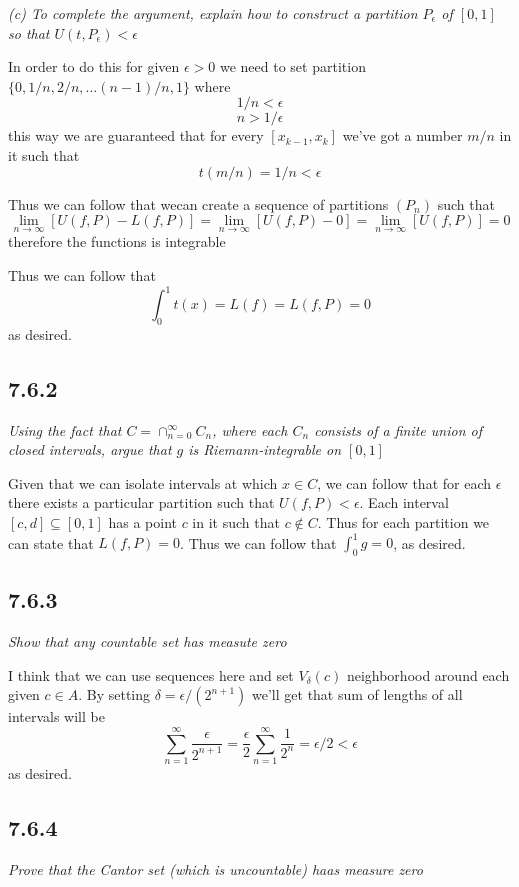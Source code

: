 \documentclass[11pt,oneside,titlepage]{book}
\begin{document}
\textit{(c) To complete the argument, explain how to construct a partition
  $P_\epsilon$ of $[0, 1]$ so that $U(t, P_\epsilon) < \epsilon$}

In order to do this for given $\epsilon > 0$ we need to set partition
$\{0, 1/n, 2/n, ... (n - 1)/n, 1\}$ where
$$1/n < \epsilon$$
$$n > 1/\epsilon$$
this way we are guaranteed that for every $[x_{k -1}, x_k]$ we've got
a number $m/n$ in it such that
$$t(m/n) = 1/n < \epsilon$$

Thus we can follow that wecan create a sequence of partitions $(P_n)$ such that
$$\lim_{n \to \infty}{[U(f, P) - L(f, P)]}
= \lim_{n \to \infty}{[U(f, P) - 0]} =
\lim_{n \to \infty}{[U(f, P)]} = 0$$
therefore the functions is integrable

Thus we can follow that
$$\int_0^1{t(x)} = L(f) = L(f, P) = 0$$
as desired.

\subsection*{7.6.2}
\textit{Using the fact that $C = \cap_{n = 0}^{\infty}C_n$, where each $C_n$
  consists of a finite union of closed intervals, argue that $g$ is
  Riemann-integrable on $[0, 1]$}

Given that we can isolate intervals at which $x \in C$, we can follow that
for each $\epsilon$ there exists a particular partition such that
$U(f, P) < \epsilon$. Each interval $[c, d] \subseteq [0, 1]$ has a point
$c$ in it such that $c \notin C$. Thus for each partition we can state that
$L(f, P) = 0$. Thus we can follow that $\int_0^1 g = 0$, as desired.

\subsection*{7.6.3}
\textit{Show that any countable set has measute zero}

I think that we can use sequences here and set $V_\delta(c)$ neighborhood
around each given $c \in A$. By setting $\delta = \epsilon/(2^{n + 1} )$ we'll
get that sum of lengths of all intervals will be
$$\sum_{n = 1}^\infty{\frac{ \epsilon}{2^{n + 1}}} =
\frac{\epsilon}{2}\sum_{n = 1}^\infty{\frac{1}{2^{n}}} =
\epsilon/2 < \epsilon
$$
as  desired.


\subsection*{7.6.4}
\textit{Prove that the Cantor set (which is uncountable) haas measure zero}
\end{document}
